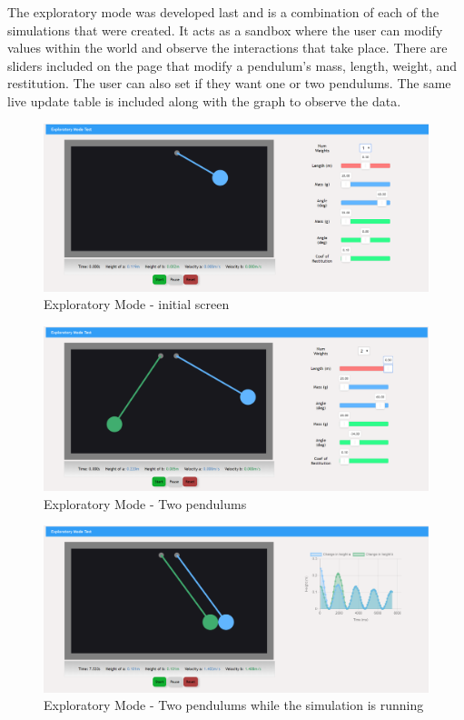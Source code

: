 \documentclass[onecolumn, draftclsnofoot,10pt, compsoc]{IEEEtran}
\begin{document}
\noindent 
The exploratory mode was developed last and is a combination of each of the simulations that were created. It acts as a sandbox where the user can modify values within the world and observe the interactions that take place. There are sliders included on the page that modify a pendulum's mass, length, weight, and restitution. The user can also set if they want one or two pendulums. The same live update table is included along with the graph to observe the data. 

\begin{figure}[H]
  \includegraphics[width=5.5 in]{pictures_beta/exploratory_start_1.png}
  \caption{Exploratory Mode - initial screen}
  \label{fig:Exploratory1}
\end{figure}

\begin{figure}[H]
  \includegraphics[width=5.5 in]{pictures_beta/exploratory_start_2.png}
  \caption{Exploratory Mode - Two pendulums}
  \label{fig:Exploratory2}
\end{figure}

\begin{figure}[H]
  \includegraphics[width=5.5 in]{pictures_beta/exploratory_mid_2.png}
  \caption{Exploratory Mode - Two pendulums while the simulation is running}
  \label{fig:Exploratory2_while}
\end{figure}
\end{document}
